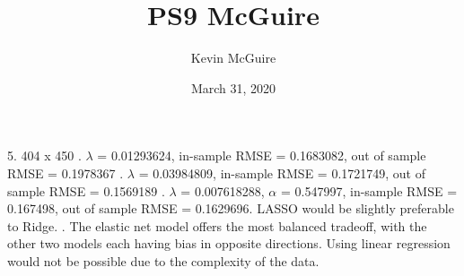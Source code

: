 \documentclass{article}
\title{PS9 McGuire}
\author{Kevin McGuire}
\date{March 31, 2020}
\begin{document}
\maketitle


5. 404 x 450
. $\lambda$ = 0.01293624, in-sample RMSE = 0.1683082, out of sample RMSE = 0.1978367
. $\lambda$ = 0.03984809, in-sample RMSE = 0.1721749, out of sample RMSE = 0.1569189
. $\lambda$ = 0.007618288, $\alpha$ = 0.547997, in-sample RMSE = 0.167498, out of sample RMSE = 0.1629696. LASSO would be slightly preferable to Ridge.
. The elastic net model offers the most balanced tradeoff, with the other two models each having bias in opposite directions. Using linear regression would not be possible due to the complexity of the data.
\end{document}
